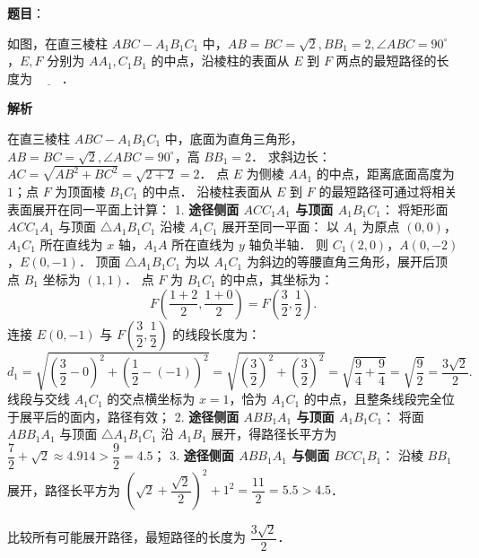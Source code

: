 \begin{answer}

\textbf{题目}：

如图，在直三棱柱 $ABC - A_1B_1C_1$ 中，$AB = BC = \sqrt{2}, BB_1 = 2, \angle ABC = 90^\circ$，$E, F$ 分别为 $AA_1, C_1B_1$ 的中点，沿棱柱的表面从 $E$ 到 $F$ 两点的最短路径的长度为 $\underline{\hspace{2em}}$．
\nopagebreak[4]
\begin{center}\end{center}
\nopagebreak[4]
\textbf{解析}

在直三棱柱 $ABC - A_1B_1C_1$ 中，底面为直角三角形，$AB = BC = \sqrt{2}, \angle ABC = 90^\circ$，高 $BB_1 = 2$．
求斜边长：$AC = \sqrt{AB^2 + BC^2} = \sqrt{2 + 2} = 2$．
点 $E$ 为侧棱 $AA_1$ 的中点，距离底面高度为 $1$；点 $F$ 为顶面棱 $B_1C_1$ 的中点．
沿棱柱表面从 $E$ 到 $F$ 的最短路径可通过将相关表面展开在同一平面上计算：
1. \textbf{途径侧面 $ACC_1A_1$ 与顶面 $A_1B_1C_1$}：
   将矩形面 $ACC_1A_1$ 与顶面 $\triangle A_1B_1C_1$ 沿棱 $A_1C_1$ 展开至同一平面：
   以 $A_1$ 为原点 $(0, 0)$，$A_1C_1$ 所在直线为 $x$ 轴，$A_1A$ 所在直线为 $y$ 轴负半轴．
   则 $C_1(2, 0)$，$A(0, -2)$，$E(0, -1)$．
   顶面 $\triangle A_1B_1C_1$ 为以 $A_1C_1$ 为斜边的等腰直角三角形，展开后顶点 $B_1$ 坐标为 $(1, 1)$．
   点 $F$ 为 $B_1C_1$ 的中点，其坐标为：
\nopagebreak[4]
\[
F\left(\dfrac{1 + 2}{2}, \dfrac{1 + 0}{2}\right) = F\left(\dfrac{3}{2}, \dfrac{1}{2}\right).
\]
   连接 $E(0, -1)$ 与 $F\left(\dfrac{3}{2}, \dfrac{1}{2}\right)$ 的线段长度为：
\nopagebreak[4]
\[
d_1 = \sqrt{\left(\dfrac{3}{2} - 0\right)^2 + \left(\dfrac{1}{2} - (-1)\right)^2} = \sqrt{\left(\dfrac{3}{2}\right)^2 + \left(\dfrac{3}{2}\right)^2} = \sqrt{\dfrac{9}{4} + \dfrac{9}{4}} = \sqrt{\dfrac{9}{2}} = \dfrac{3\sqrt{2}}{2}.
\]
   线段与交线 $A_1C_1$ 的交点横坐标为 $x = 1$，恰为 $A_1C_1$ 的中点，且整条线段完全位于展平后的面内，路径有效；
2. \textbf{途径侧面 $ABB_1A_1$ 与顶面 $A_1B_1C_1$}：
   将面 $ABB_1A_1$ 与顶面 $\triangle A_1B_1C_1$ 沿 $A_1B_1$ 展开，得路径长平方为 $\dfrac{7}{2} + \sqrt{2} \approx 4.914 > \dfrac{9}{2} = 4.5$；
3. \textbf{途径侧面 $ABB_1A_1$ 与侧面 $BCC_1B_1$}：
   沿棱 $BB_1$ 展开，路径长平方为 $\left(\sqrt{2} + \dfrac{\sqrt{2}}{2}\right)^2 + 1^2 = \dfrac{11}{2} = 5.5 > 4.5$．

比较所有可能展开路径，最短路径的长度为 $\dfrac{3\sqrt{2}}{2}$．


\end{answer}
